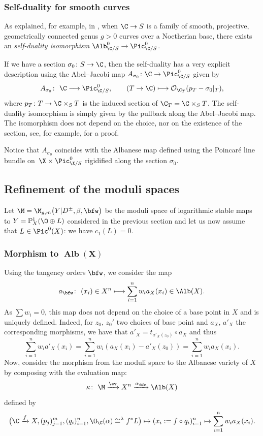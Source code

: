 \subsubsection{Self-duality for smooth curves} As explained, for example, in \cite[Section~9.5.26]{fantechi2006fundamental}, when $\C\to S$ is a family of smooth, projective, geometrically connected genus $g>0$
curves over a Noetherian base, there exists an \emph{self-duality isomorphism}
$\Alb^0_{\C\slash S}\to \Pic^0_{\C\slash S}$.

 If we have a section $\sigma_0\colon S\to \C$, then the self-duality has a very explicit description using the Abel--Jacobi map $A_{\sigma_0}\colon\C\to\Pic^0_{\C/S}$ given by
\[
 A_{\mathcal \sigma_0}\colon \ \C \longrightarrow \Pic^0_{\C\slash S},\qquad
 (T\to\C) \longmapsto \mathcal O_{\C_T}(p_T -\sigma_0\rvert_T),
\]
where $p_T\colon T\to\C\times_S T$ is the induced section of $\C_T=\C\times_S T$.
The self-duality isomorphism is simply given by the pullback along the Abel--Jacobi map. The isomorphism does not depend on the choice, nor on the existence of the section, see, for example, \cite{esteves2002autoduality} for a proof.

Notice that $A_{\sigma_0}$ coincides with the Albanese map defined using the Poincar\'e line bundle on~${\X\times\Pic^0_{\X\slash S}}$ rigidified along the section $\sigma_0$.

\subsection{Refinement of the moduli spaces}

Let $\M=\M_{g,m}\bigl(Y|D^\pm,\beta,\bfw\bigr)$ be the moduli space of logarithmic stable maps to $Y=\mathbb P_X^1(\O\oplus L)$ considered in the previous section and let us now assume that $L\in\Pic^0(X)$: we have $c_1(L)=0$.


\subsubsection[Morphism to Alb(X)]{Morphism to $\boldsymbol{\operatorname{Alb}(X)}$}
Using the tangency orders $\bfw$, we consider the map
\[ a_\bfw\colon \ (x_i)\in X^n\longmapsto\sum_{i=1}^n w_i a_X(x_i)\in\Alb(X). \]
As $\sum w_i=0$, this map does not depend on the choice of a base point in $X$ and is uniquely defined. Indeed, for $z_0$, $z_0'$ two choices of base point and $a_X$, $a'_X$ the corresponding morphisms, we have that $a'_X= t_{a'_X(z_0)}\circ a_X$ and thus
\[
 \sum_{i=1}^n w_i a'_X(x_i)= \sum_{i=1}^n w_i (a_X(x_i) -a'_X(z_0))= \sum_{i=1}^n w_i a_X(x_i).
\]
Now, consider the morphism from the moduli space to the Albanese variety of $X$ by composing with the evaluation map:
\[ \kappa\colon\ \M\xrightarrow{\ev} X^n\xrightarrow{a_\bfw} \Alb(X)\]
defined by
\[%
\bigl(\C\xrightarrow{f} X,(p_j)_{j=1}^m,(q_i)_{i=1}^n,\O_{\C}(\alpha)\cong^{\lambda} f^*L\bigr)\mapsto (x_i:=f\circ q_i)_{i=1}^n\mapsto \sum_{i=1}^n w_i a_X(x_i).
\]

